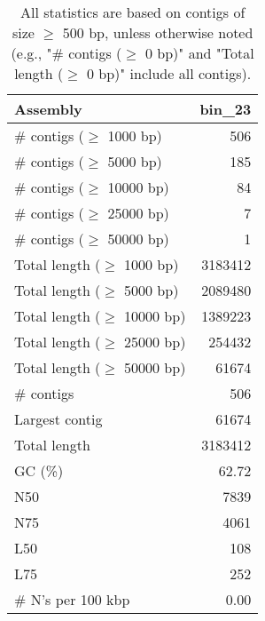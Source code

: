 \documentclass[12pt,a4paper]{article}
\begin{document}
\begin{table}[ht]
\begin{center}
\caption{All statistics are based on contigs of size $\geq$ 500 bp, unless otherwise noted (e.g., "\# contigs ($\geq$ 0 bp)" and "Total length ($\geq$ 0 bp)" include all contigs).}
\begin{tabular}{|l*{1}{|r}|}
\hline
Assembly & bin\_23 \\ \hline
\# contigs ($\geq$ 1000 bp) & 506 \\ \hline
\# contigs ($\geq$ 5000 bp) & 185 \\ \hline
\# contigs ($\geq$ 10000 bp) & 84 \\ \hline
\# contigs ($\geq$ 25000 bp) & 7 \\ \hline
\# contigs ($\geq$ 50000 bp) & 1 \\ \hline
Total length ($\geq$ 1000 bp) & 3183412 \\ \hline
Total length ($\geq$ 5000 bp) & 2089480 \\ \hline
Total length ($\geq$ 10000 bp) & 1389223 \\ \hline
Total length ($\geq$ 25000 bp) & 254432 \\ \hline
Total length ($\geq$ 50000 bp) & 61674 \\ \hline
\# contigs & 506 \\ \hline
Largest contig & 61674 \\ \hline
Total length & 3183412 \\ \hline
GC (\%) & 62.72 \\ \hline
N50 & 7839 \\ \hline
N75 & 4061 \\ \hline
L50 & 108 \\ \hline
L75 & 252 \\ \hline
\# N's per 100 kbp & 0.00 \\ \hline
\end{tabular}
\end{center}
\end{table}
\end{document}
